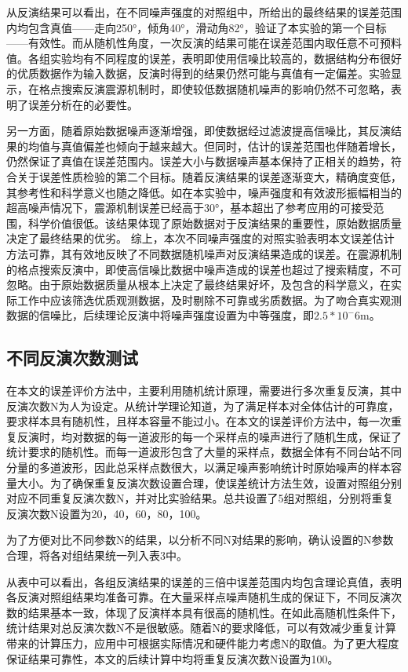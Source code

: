 从反演结果可以看出，在不同噪声强度的对照组中，所给出的最终结果的误差范围内均包含真值——走向250°，倾角40°，滑动角82°，验证了本实验的第一个目标——有效性。而从随机性角度，一次反演的结果可能在误差范围内取任意不可预料值。各组实验均有不同程度的误差，表明即使用信噪比较高的，数据结构分布很好的优质数据作为输入数据，反演时得到的结果仍然可能与真值有一定偏差。实验显示，在格点搜索反演震源机制时，即使较低数据随机噪声的影响仍然不可忽略，表明了误差分析在的必要性。

另一方面，随着原始数据噪声逐渐增强，即使数据经过滤波提高信噪比，其反演结果的均值与真值偏差也倾向于越来越大。但同时，估计的误差范围也伴随着增长，仍然保证了真值在误差范围内。误差大小与数据噪声基本保持了正相关的趋势，符合关于误差性质检验的第二个目标。随着反演结果的误差逐渐变大，精确度变低，其参考性和科学意义也随之降低。如在本实验中，噪声强度和有效波形振幅相当的超高噪声情况下，震源机制误差已经高于30°，基本超出了参考应用的可接受范围，科学价值很低。该结果体现了原始数据对于反演结果的重要性，原始数据质量决定了最终结果的优劣。 综上，本次不同噪声强度的对照实验表明本文误差估计方法可靠，其有效地反映了不同数据随机噪声对反演结果造成的误差。在震源机制的格点搜索反演中，即使高信噪比数据中噪声造成的误差也超过了搜索精度，不可忽略。由于原始数据质量从根本上决定了最终结果好坏，及包含的科学意义，在实际工作中应该筛选优质观测数据，及时剔除不可靠或劣质数据。为了吻合真实观测数据的信噪比，后续理论反演中将噪声强度设置为中等强度，即$2.5*10^-6$m。

\subsection{不同反演次数测试}
在本文的误差评价方法中，主要利用随机统计原理，需要进行多次重复反演，其中反演次数N为人为设定。从统计学理论知道，为了满足样本对全体估计的可靠度，要求样本具有随机性，且样本容量不能过小。在本文的误差评价方法中，每一次重复反演时，均对数据的每一道波形的每一个采样点的噪声进行了随机生成，保证了统计要求的随机性。而每一道波形包含了大量的采样点，数据全体有不同台站不同分量的多道波形，因此总采样点数很大，以满足噪声影响统计时原始噪声的样本容量大小。为了确保重复反演次数设置合理，使误差统计方法生效，设置对照组分别对应不同重复反演次数N，并对比实验结果。总共设置了5组对照组，分别将重复反演次数N设置为20，40，60，80，100。

为了方便对比不同参数N的结果，以分析不同N对结果的影响，确认设置的N参数合理，将各对组结果统一列入表3中。

从表中可以看出，各组反演结果的误差的三倍中误差范围内均包含理论真值，表明各反演对照组结果均准备可靠。在大量采样点噪声随机生成的保证下，不同反演次数的结果基本一致，体现了反演样本具有很高的随机性。在如此高随机性条件下，统计结果对总反演次数N不是很敏感。随着N的要求降低，可以有效减少重复计算带来的计算压力，应用中可根据实际情况和硬件能力考虑N的取值。为了更大程度保证结果可靠性，本文的后续计算中均将重复反演次数N设置为100。

